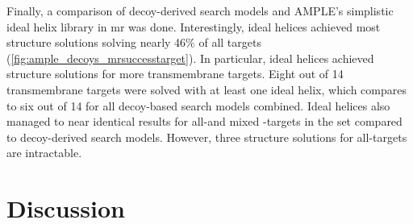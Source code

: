 Finally, a comparison of decoy-derived search models and AMPLE's simplistic ideal helix library \cite{Thomas2015-wu} in \gls{mr} was done. Interestingly, ideal helices achieved most structure solutions solving nearly 46\% of all targets (\cref{fig:ample_decoys_mrsuccesstarget}). In particular, ideal helices achieved structure solutions for more transmembrane targets. Eight out of 14 transmembrane targets were solved with at least one ideal helix, which compares to six out of 14 for all decoy-based search models combined. Ideal helices also managed to near identical results for all-\textalpha and mixed \textalpha-\textbeta targets in the set compared to decoy-derived search models. However, three structure solutions for all-\textbeta targets are intractable.

\section{Discussion}
